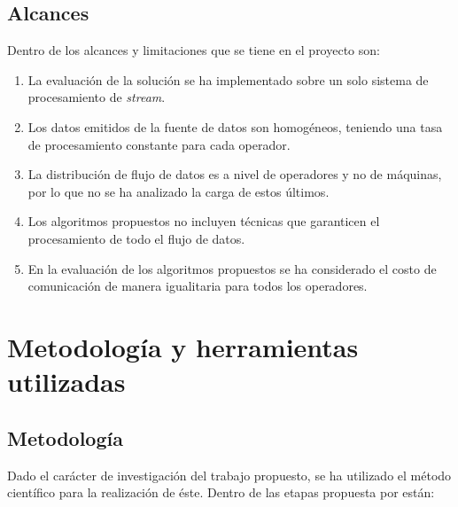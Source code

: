 \subsection{Alcances}
Dentro de los alcances y limitaciones que se tiene en el proyecto son:
\begin{enumerate}
	\item La evaluaci\'on de la soluci\'on se ha implementado sobre un solo sistema de procesamiento de \textit{stream}.
	\item Los datos emitidos de la fuente de datos son homog\'eneos, teniendo una tasa de procesamiento \normalsize{constante para cada operador.}
	\item La distribuci\'on de flujo de datos es a nivel de operadores y no de m\'aquinas, por lo que no se ha analizado la carga de estos \'ultimos.
	\item Los algoritmos propuestos no incluyen t\'ecnicas que garanticen el procesamiento de todo el flujo de datos.
	\item En la evaluaci\'on de los algoritmos propuestos se ha considerado el costo de comunicaci\'on de manera igualitaria para todos los operadores.
\end{enumerate}


\section{Metodolog\'ia y herramientas utilizadas}
\label{intro:metodologia}

\subsection{Metodolog\'ia}
Dado el car\'acter de investigaci\'on del trabajo propuesto, se ha utilizado el m\'etodo cient\'ifico para la realizaci\'on de \'este. Dentro de las etapas propuesta por \citep{hernandez2010metodologia} est\'an:

